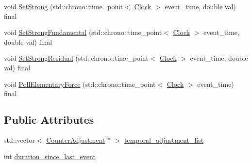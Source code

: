 \begin{DoxyCompactItemize}
void \mbox{\hyperlink{classDimension_ab9021cb6727ed590026bf870c638576d}{Set\+Strong}} (std\+::chrono\+::time\+\_\+point$<$ \mbox{\hyperlink{universe_8h_a0ef8d951d1ca5ab3cfaf7ab4c7a6fd80}{Clock}} $>$ event\+\_\+time, double val) final
\item 
void \mbox{\hyperlink{classDimension_a2de864aaa4b1074684395dbe928468c1}{Set\+Strong\+Fundamental}} (std\+::chrono\+::time\+\_\+point$<$ \mbox{\hyperlink{universe_8h_a0ef8d951d1ca5ab3cfaf7ab4c7a6fd80}{Clock}} $>$ event\+\_\+time, double val) final
\item 
void \mbox{\hyperlink{classDimension_a9bd5480b1da689cd58bf61dac7169080}{Set\+Strong\+Residual}} (std\+::chrono\+::time\+\_\+point$<$ \mbox{\hyperlink{universe_8h_a0ef8d951d1ca5ab3cfaf7ab4c7a6fd80}{Clock}} $>$ event\+\_\+time, double val) final
\item 
void \mbox{\hyperlink{classDimension_a5b07f5c8558233c8f3488baf1fe3459a}{Poll\+Elementary\+Force}} (std\+::chrono\+::time\+\_\+point$<$ \mbox{\hyperlink{universe_8h_a0ef8d951d1ca5ab3cfaf7ab4c7a6fd80}{Clock}} $>$ event\+\_\+time) final
\end{DoxyCompactItemize}
\subsection*{Public Attributes}
\begin{DoxyCompactItemize}
\item 
std\+::vector$<$ \mbox{\hyperlink{structDimension_1_1CounterAdjustment}{Counter\+Adjustment}} $\ast$ $>$ \mbox{\hyperlink{classDimension_a370bb42cca1211c7a6c66846ecec4dd9}{temporal\+\_\+adjustment\+\_\+list}}
\item 
int \mbox{\hyperlink{classDimension_a8095020214e474081002dbf7d9ff9d42}{duration\+\_\+since\+\_\+last\+\_\+event}}
\end{DoxyCompactItemize}
